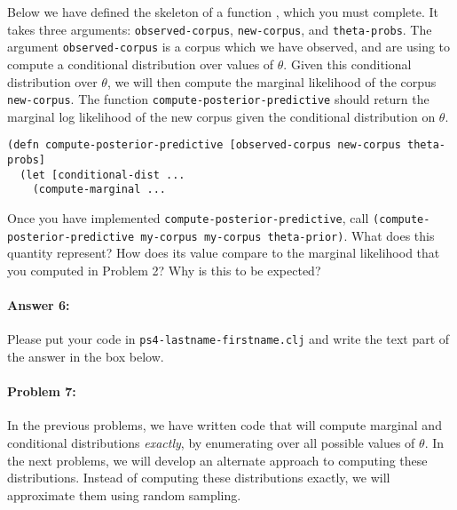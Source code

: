 \documentclass[10pt]{article}
\newenvironment{AnswerBox}{\begin{mdframed}[style=simple]}{\end{mdframed}}
\newcommand{\required}[1]{{\color{blue}{#1}}}
\newcommand{\PSnum}{4}
\begin{document}
 Below we have defined the skeleton of a function
\required{\texttt{compute-posterior-predictive}}, which you must
complete. It takes three arguments: \texttt{observed-corpus},
\texttt{new-corpus}, and \texttt{theta-probs}. The argument
\texttt{observed-corpus} is a corpus which we have observed, and are
using to compute a conditional distribution over values of $\theta$.
Given this conditional distribution over $\theta$, we will then
compute the marginal likelihood of the corpus \texttt{new-corpus}. The
function \texttt{compute-posterior-predictive} should return the
marginal log likelihood of the new corpus given the conditional
distribution on $\theta$.

\begin{lstlisting}
(defn compute-posterior-predictive [observed-corpus new-corpus theta-probs]
  (let [conditional-dist ...
    (compute-marginal ...
\end{lstlisting}

 Once you have implemented
\texttt{compute-posterior-predictive}, call
\texttt{(compute-posterior-predictive my-corpus my-corpus
theta-prior)}. What does this quantity represent? How does its value
compare to the marginal likelihood that you computed in Problem 2? Why
is this to be expected?

\paragraph{Answer 6:} Please put your code in
\texttt{ps\PSnum-lastname-firstname.clj} and write the text part of
the answer in the box below.

\begin{AnswerBox}%

    
\end{AnswerBox}%

\hrulefill %

\paragraph{Problem 7:}
In the previous problems, we have written code that will compute
marginal and conditional distributions \emph{exactly}, by enumerating
over all possible values of $\theta$. In the next problems, we will
develop an alternate approach to computing these distributions.
Instead of computing these distributions exactly, we will approximate
them using random sampling.  \\
\end{document}
